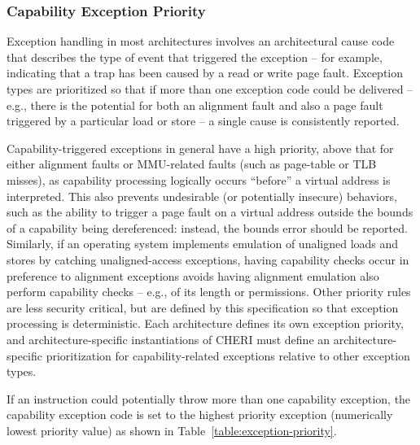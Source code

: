 \subsubsection{Capability Exception Priority}
\label{sec:capability_exception_priority}

Exception handling in most architectures involves an architectural cause code
that describes the type of event that triggered the exception -- for example,
indicating that a trap has been caused by a read or write page fault.
Exception types are prioritized so that if more than one exception code could
be delivered -- e.g., there is the potential for both an alignment fault and
also a page fault triggered by a particular load or store -- a single cause is
consistently reported.

Capability-triggered exceptions in general have a high priority, above that
for either alignment faults or MMU-related faults (such as page-table or TLB
misses), as capability processing logically occurs ``before'' a virtual
address is interpreted.
This also prevents undesirable (or potentially insecure) behaviors, such as
the ability to trigger a page fault on a virtual address outside the bounds of
a capability being dereferenced: instead, the bounds error should be reported.
Similarly, if an operating system implements emulation of unaligned loads and
stores by catching unaligned-access exceptions, having capability checks occur
in preference to alignment exceptions avoids having alignment emulation also
perform capability checks -- e.g., of its length or permissions.
Other priority rules are less security critical, but are defined by this
specification so that exception processing is deterministic.
Each architecture defines its own exception priority, and
architecture-specific instantiations of CHERI must define an
architecture-specific prioritization for capability-related exceptions
relative to other exception types.

If an instruction could potentially throw more than one capability exception,
the capability exception code is set to the highest priority exception (numerically lowest
priority value) as shown in Table~\ref{table:exception-priority}.

